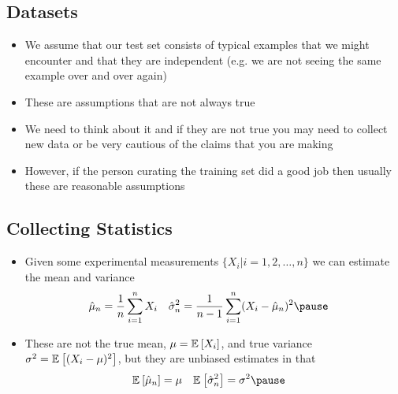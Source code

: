 
\begin{slide}
\section{Datasets}

\begin{PauseHighLight}
  \begin{itemize}
  \item We assume that our test set consists of typical examples that
    we might encounter and that they are independent (e.g. we are not
    seeing the same example over and over again)\pause
  \item These are assumptions that are not always true\pause
  \item We need to think about it and if they are not true you may need
    to collect new data or be very cautious of the claims that you are
    making\pause
  \item However, if the person curating the training set did a good
    job then usually these are reasonable assumptions\pause
  \end{itemize}
\end{PauseHighLight}

\end{slide}


\begin{slide}
\section{Collecting Statistics}

\begin{PauseHighLight}
  \begin{itemize}
  \item Given some experimental measurements $\{X_i| i=1,2,\ldots,n\}$
    we can estimate the mean and variance
    \begin{align*}
      \hat{\mu}_n &= \frac{1}{n} \sum_{i=1}^n X_i &
      \hat{\sigma}_n^2 &= \frac{1}{n-1} \sum_{i=1}^n (X_i-\hat{\mu}_n)^2\pause
    \end{align*}
  \item These are not the true mean, $\mu=\mathbb{E}_{}\left[ X_i \right]$, and true variance
    $\sigma^2=\mathbb{E}_{}\left[ (X_i-\mu)^2 \right]$, but they are unbiased estimates in that
    \begin{align*}
      \av{\hat{\mu}_n} &= \mu & \av{\hat{\sigma}_n^2} &= \sigma^2\pause
    \end{align*}
  \end{itemize}
\end{PauseHighLight}

\end{slide}

